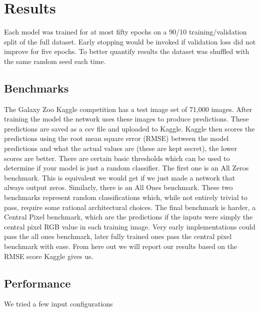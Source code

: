 \section{Results}



Each model was trained for at most fifty epochs on a 90/10 training/validation split of the full dataset. Early stopping would be invoked if validation loss did not improve for five epochs. To better quantify results the dataset was shuffled with the same random seed each time.

\subsection{Benchmarks}
The Galaxy Zoo Kaggle competition has a test image set of 71,000 images. After training the model the network uses these images to produce predictions. These predictions are saved as a csv file and uploaded to Kaggle. Kaggle then scores the predictions using the root mean square error (RMSE) between the model predictions and what the actual values are (these are kept secret), the lower scores are better. There are certain basic thresholds which can be used to determine if your model is just a random classifier. The first one is an All Zeros benchmark. This is equivalent we would get if we just made a network that always output zeros. Similarly, there is an All Ones benchmark. These two benchmarks represent random classifications which, while not entirely trivial to pass, require some rational architectural choices. The final benchmark is harder, a Central Pixel benchmark, which are the predictions if the inputs were simply the central pixel RGB value in each training image. Very early implementations could pass the all ones benchmark, later fully trained ones pass the central pixel benchmark with ease. From here out we will report our results based on the RMSE score Kaggle gives us.

\subsection{Performance}

We tried a few input configurations